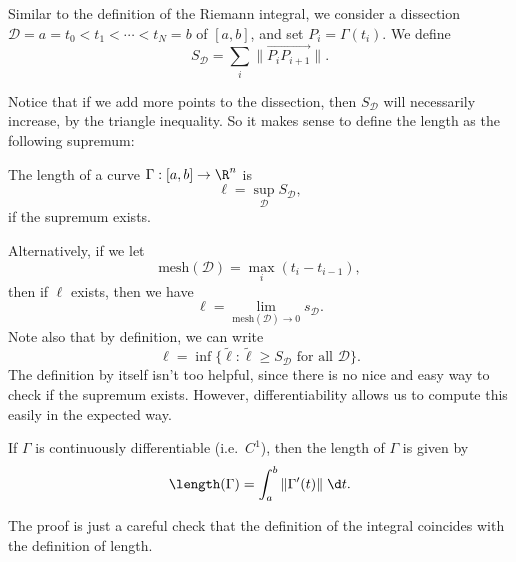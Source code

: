 \documentclass[a4paper]{article}
\begin{document}
Similar to the definition of the Riemann integral, we consider a dissection $\mathcal{D} = a = t_0 < t_1 < \cdots < t_N = b$ of $[a, b]$, and set $P_i = \Gamma(t_i)$. We define
\[
  S_\mathcal{D} = \sum_i \|\overrightarrow{P_i P_{i + 1}}\|.
\]
\begin{center}
\end{center}
Notice that if we add more points to the dissection, then $S_\mathcal{D}$ will necessarily increase, by the triangle inequality. So it makes sense to define the length as the following supremum:
\begin{defi}
  The length of a curve $\Gamma: [a, b] \to \R^n$ is
  \[
    \ell = \sup_{\mathcal{D}} S_{\mathcal{D}},
  \]
  if the supremum exists.
\end{defi}
Alternatively, if we let
\[
  \mathrm{mesh}(\mathcal{D})= \max_i (t_i - t_{i - 1}),
\]
then if $\ell$ exists, then we have
\[
  \ell = \lim_{\mathrm{mesh}(\mathcal{D}) \to 0} s_{\mathcal{D}}.
\]
Note also that by definition, we can write
\[
  \ell = \inf\{\tilde{\ell}: \tilde{\ell} \geq S_{\mathcal{D}}\text{ for all }\mathcal{D}\}.
\]
The definition by itself isn't too helpful, since there is no nice and easy way to check if the supremum exists. However, differentiability allows us to compute this easily in the expected way.
\begin{prop}
  If $\Gamma$ is continuously differentiable (i.e.\ $C^1$), then the length of $\Gamma$ is given by
  \[
    \length(\Gamma) = \int_a^b \|\Gamma'(t)\|\;\d t.
  \]
\end{prop}
The proof is just a careful check that the definition of the integral coincides with the definition of length.
\end{document}
